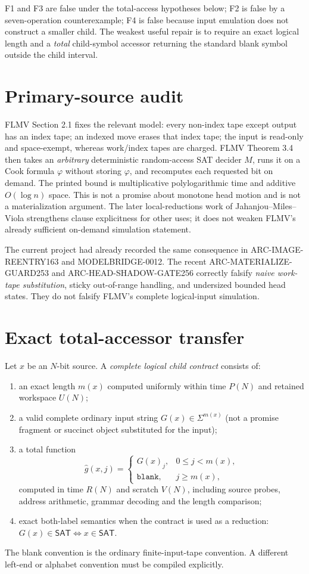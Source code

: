 \documentclass[11pt]{article}
\newcommand{\SAT}{\mathsf{SAT}}
\newcommand{\blank}{\mathtt{blank}}
\begin{document}
F1 and F3 are false under the total-access hypotheses below; F2 is false by a seven-operation counterexample; F4 is false because input emulation does not construct a smaller child. The weakest useful repair is to require an exact logical length and a \emph{total} child-symbol accessor returning the standard blank symbol outside the child interval.

\section{Primary-source audit}
FLMV Section 2.1 fixes the relevant model: every non-index tape except output has an index tape; an indexed move erases that index tape; the input is read-only and space-exempt, whereas work/index tapes are charged. FLMV Theorem 3.4 then takes an \emph{arbitrary} deterministic random-access SAT decider $M$, runs it on a Cook formula $\varphi$ without storing $\varphi$, and recomputes each requested bit on demand. The printed bound is multiplicative polylogarithmic time and additive $O(\log n)$ space. This is not a promise about monotone head motion and is not a materialization argument. The later local-reductions work of Jahanjou--Miles--Viola strengthens clause explicitness for other uses; it does not weaken FLMV's already sufficient on-demand simulation statement.

The current project had already recorded the same consequence in ARC-IMAGE-REENTRY163 and MODELBRIDGE-0012. The recent ARC-MATERIALIZE-GUARD253 and ARC-HEAD-SHADOW-GATE256 correctly falsify \emph{naive work-tape substitution}, sticky out-of-range handling, and undersized bounded head states. They do not falsify FLMV's complete logical-input simulation.

\section{Exact total-accessor transfer}
Let $x$ be an $N$-bit source. A \emph{complete logical child contract} consists of:
\begin{enumerate}
\item an exact length $m(x)$ computed uniformly within time $P(N)$ and retained workspace $U(N)$;
\item a valid complete ordinary input string $G(x)\in\Sigma^{m(x)}$ (not a promise fragment or succinct object substituted for the input);
\item a total function
\[
 \widehat g(x,j)=
 \begin{cases}G(x)_j,&0\le j<m(x),\\ \blank,&j\ge m(x),\end{cases}
\]
computed in time $R(N)$ and scratch $V(N)$, including source probes, address arithmetic, grammar decoding and the length comparison;
\item exact both-label semantics when the contract is used as a reduction: $G(x)\in\SAT\Longleftrightarrow x\in\SAT$.
\end{enumerate}
The blank convention is the ordinary finite-input-tape convention. A different left-end or alphabet convention must be compiled explicitly.
\end{document}

